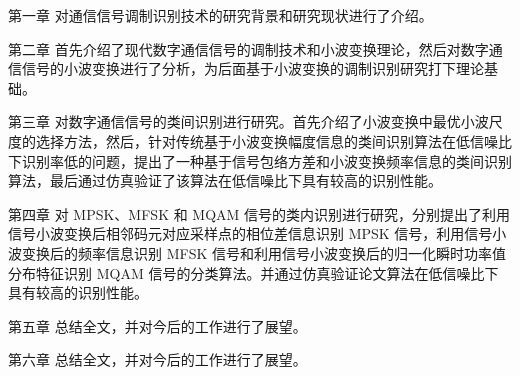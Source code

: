 第一章 对通信信号调制识别技术的研究背景和研究现状进行了介绍。\par

第二章 首先介绍了现代数字通信信号的调制技术和小波变换理论，然后对数字通信信号的小波变换进行了分析，为后面基于小波变换的调制识别研究打下理论基础。 \par

第三章 对数字通信信号的类间识别进行研究。首先介绍了小波变换中最优小波尺度的选择方法，然后，针对传统基于小波变换幅度信息的类间识别算法在低信噪比下识别率低的问题，提出了一种基于信号包络方差和小波变换频率信息的类间识别算法，最后通过仿真验证了该算法在低信噪比下具有较高的识别性能。 \par

第四章 对 MPSK、MFSK 和 MQAM 信号的类内识别进行研究，分别提出了利用信号小波变换后相邻码元对应采样点的相位差信息识别 MPSK 信号，利用信号小波变换后的频率信息识别 MFSK 信号和利用信号小波变换后的归一化瞬时功率值分布特征识别 MQAM 信号的分类算法。并通过仿真验证论文算法在低信噪比下具有较高的识别性能。 \par

第五章 总结全文，并对今后的工作进行了展望。\par

第六章 总结全文，并对今后的工作进行了展望。\par
